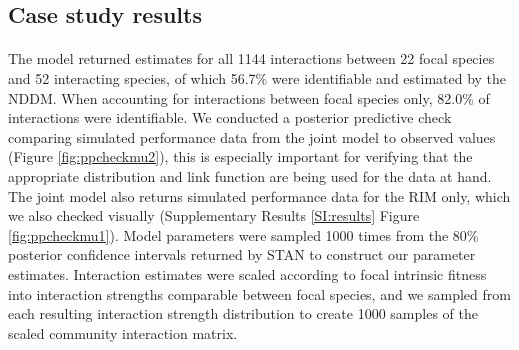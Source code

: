 \documentclass[a4,12pt]{article}
\begin{document}
\begin{refsection}
    \subsection{Case study results}

    \paragraph{}
    The model returned estimates for all 1144 interactions between 22 focal species and 52 interacting species, of which 56.7\% were identifiable and estimated by the NDDM. When accounting for interactions between focal species only, 82.0\% of interactions were identifiable. We conducted a posterior predictive check comparing simulated performance data from the joint model to observed values (Figure \ref{fig:ppcheckmu2}), this is especially important for verifying that the appropriate distribution and link function are being used for the data at hand. The joint model also returns simulated performance data for the RIM only, which we also checked visually (Supplementary Results \ref{SI:results} Figure \ref{fig:ppcheckmu1}). Model parameters were sampled 1000 times from the 80\% posterior confidence intervals returned by STAN to construct our parameter estimates. Interaction estimates were scaled according to focal intrinsic fitness into interaction strengths comparable between focal species, and we sampled from each resulting interaction strength distribution to create 1000 samples of the scaled community interaction matrix.


\end{refsection}
\end{document}
